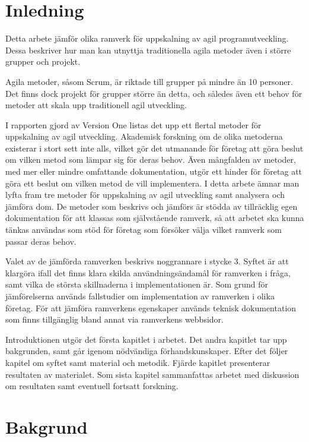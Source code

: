 \section{Inledning}
	
	Detta arbete jämför olika ramverk för uppskalning av agil programutveckling. Dessa beskriver hur man kan utnyttja traditionella agila metoder även i större grupper och projekt. 
	
	Agila metoder, såsom Scrum, är riktade till grupper på mindre än 10 personer\cite{scrum_guide}. Det finns dock projekt för grupper större än detta, och således även ett behov för metoder att skala upp traditionell agil utveckling.
	
	I rapporten gjord av Version One \cite{version_one_report} listas det upp ett flertal metoder för uppskalning av agil utveckling. Akademisk forskning om de olika metoderna existerar i stort sett inte alls, vilket gör det utmanande för företag att göra beslut om vilken metod som lämpar sig för deras behov. Även mångfalden av metoder, med mer eller mindre omfattande dokumentation, utgör ett hinder för företag att göra ett beslut om vilken metod de vill implementera. 	
	I detta arbete ämnar man lyfta fram tre metoder för uppskalning av agil utveckling samt analysera och jämföra dom.
	De metoder som beskrivs och jämförs är stödda av tillräcklig egen dokumentation för att klassas som självstående ramverk, så att arbetet ska kunna tänkas användas som stöd för företag som försöker välja vilket ramverk som passar deras behov.
	
	Valet av de jämförda ramverken beskrivs noggrannare i stycke 3.
	Syftet är att klargöra ifall det finns klara skilda användningsändamål för ramverken i fråga, samt vilka de största skillnaderna i implementationen är. Som grund för jämförelserna används fallstudier om implementation av ramverken i olika företag. För att jämföra ramverkens egenskaper används teknisk dokumentation som finns tillgänglig bland annat via ramverkens webbsidor.
	
	Introduktionen utgör det första kapitlet i arbetet. Det andra kapitlet tar upp bakgrunden, samt går igenom nödvändiga förhandskunskaper. Efter det följer kapitel om syftet samt material och metodik. Fjärde kapitlet presenterar resultaten av materialet. Som sista kapitel sammanfattas arbetet med diskussion om resultaten samt eventuell fortsatt forskning.
	
	
\newpage
\section{Bakgrund}
	
